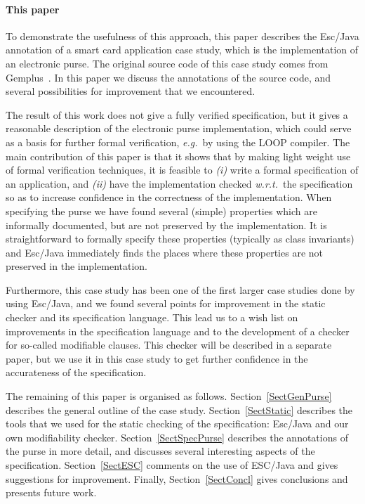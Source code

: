 \documentclass[a4paper]{llncs}
\newcommand{\comment}[1]{\marginpar{\framebox{\begin{minipage}{\marginparwidth}{#1}\end{minipage}}}}
\begin{document}
\paragraph{This paper}
To demonstrate the usefulness of this approach, this paper describes
the Esc/Java annotation of a smart card application case study, which
is the implementation of an electronic purse. The original source code
of this case study comes from Gemplus~\cite{PurseUrl}. In this
paper we discuss the annotations of the source code, and several
possibilities for improvement that we encountered.

The result of this work does not give a fully verified specification,
but it gives a reasonable description of the electronic purse
implementation, which could serve as a basis for further formal
verification, \emph{e.g.}~by using the LOOP compiler.  The main
contribution of this paper is that it shows that by making light
weight use of formal verification techniques, it is feasible to
\emph{(i)} write a formal specification of an application, and
\emph{(ii)} have the implementation checked \emph{w.r.t.}~the 
specification so as to increase confidence in the correctness of the
implementation. When specifying the purse we have
found several (simple) properties which are informally documented, but
are not preserved by the implementation. It is straightforward to
formally specify these properties (typically as class invariants) and
Esc/Java immediately finds the places where these properties are
not preserved in the implementation.

Furthermore, this case study has been one of the first larger case
studies done by using Esc/Java\comment{Is this correct?}, and we found
several points for improvement in the static checker and its
specification language. This lead us to a wish list on improvements in
the specification language and to the development of a checker for
so-called modifiable clauses. This checker will be described in a
separate paper, but we use it in this case study to get further
confidence in the accurateness of the specification.

The remaining of this paper is organised as
follows. Section~\ref{SectGenPurse} describes the general outline of
the case study. Section~\ref{SectStatic} describes the tools that we
used for the static checking of the specification: Esc/Java and our
own modifiability checker. Section~\ref{SectSpecPurse} describes the
annotations of the purse in more detail, and discusses several
interesting aspects of the specification. Section~\ref{SectESC}
comments on the use of ESC/Java and gives suggestions for
improvement. Finally, Section~\ref{SectConcl} gives conclusions and
presents future work.
\end{document}
